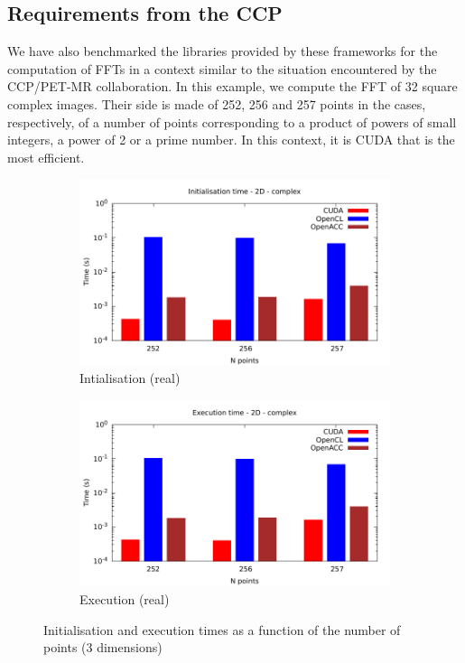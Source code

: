 \documentclass[12pt, a4paper]{article}
\begin{document}
\subsection{Requirements from the CCP}\label{CCPPETMR}
We have also benchmarked the libraries provided by these frameworks for the computation of FFTs in a context similar to the situation encountered by the CCP/PET-MR collaboration. In this example, we compute the FFT of 32 square complex images. Their side is made of 252, 256 and 257 points in the cases, respectively, of a number of points corresponding to a product of powers of small integers, a power of 2 or a prime number. In this context, it is CUDA that is the most efficient.
\begin{figure}[H]
\captionsetup{width=0.8\linewidth}
\centering
\begin{subfigure}{.5\textwidth}
\centering
\includegraphics[width=.9\linewidth]{graphs/fft-ccppetmr-init.pdf}
\caption{Intialisation (real)}
\label{FFT1DRI}
\end{subfigure}%
\begin{subfigure}{.5\textwidth}
\centering
\includegraphics[width=.9\linewidth]{graphs/fft-ccppetmr-exec.pdf}
\caption{Execution (real)}
\label{FFT1DRE}
\end{subfigure}
\caption{Initialisation and execution times as a function of the number of points (3 dimensions)}
\label{CCPPETMRGRAPH}
\end{figure}
\end{document}
